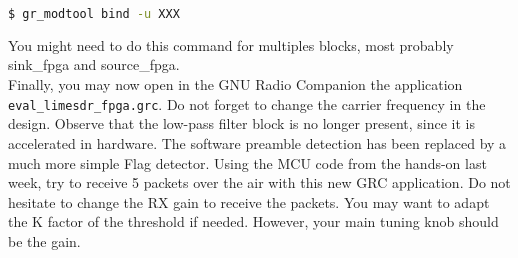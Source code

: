 \begin{lstlisting}[language=bash, keepspaces=true, columns=fullflexible]
    $ gr_modtool bind -u XXX
\end{lstlisting}

You might need to do this command for multiples blocks, most probably sink\_fpga and source\_fpga. \\

Finally, you may now open in the GNU Radio Companion the application \texttt{eval\_limesdr\_fpga.grc}. Do not forget to change the carrier frequency in the design. Observe that the low-pass filter block is no longer present, since it is accelerated in hardware. The software preamble detection has been replaced by a much more simple Flag detector. Using the MCU code from the hands-on last week, try to receive 5 packets over the air with this new GRC application. Do not hesitate to change the RX gain to receive the packets. You may want to adapt the K factor of the threshold if needed. However, your main tuning knob should be the gain.

